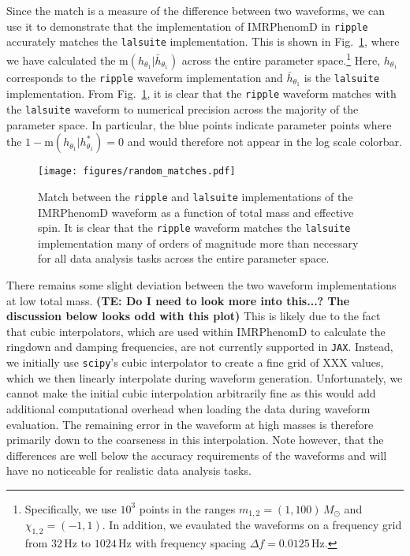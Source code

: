 \documentclass[twocolumn]{aastex631}
\newcommand{\jax}{\texttt{JAX}\xspace}
\newcommand{\ripple}{\texttt{ripple}\xspace}
\newcommand{\lalsuite}{\texttt{lalsuite}\xspace}
\newcommand{\te}[1]{\textbf{\color{pyGreen}(TE: #1)}}
\begin{document}
Since the match is a measure of the difference between two waveforms, we can use it to demonstrate that the implementation of IMRPhenomD in \ripple accurately matches the \lalsuite implementation.
This is shown in Fig.~\ref{fig:match}, where we have calculated the $\mathrm{m}(h_{\theta_1}|\bar{h}_{\theta_1})$ across the entire parameter space.\footnote{
    Specifically, we use $10^3$ points in the ranges $m_{1,2} = (1,100)\,M_{\odot}$ and $\chi_{1,2} = (-1,1)$. In addition, we evaulated the waveforms on a frequency grid from $32\,$Hz to $1024\,$Hz with frequency spacing $\Delta f = 0.0125 \,$Hz.
}
Here, $h_{\theta_1}$ corresponds to the \ripple waveform implementation and $\bar{h}_{\theta_1}$ is the \lalsuite implementation. 
From Fig.~\ref{fig:match}, it is clear that the \ripple waveform matches with the \lalsuite waveform to numerical precision across the majority of the parameter space.
In particular, the blue points indicate parameter points where the $1-\mathrm{m}(h_{\theta_1}|h^{*}_{\theta_1})=0$ and would therefore not appear in the log scale colorbar.
\begin{figure}[t]
    \begin{centering}
        \texttt{[image: figures/random\_matches.pdf]}
        \caption{
            Match between the \ripple and \lalsuite implementations of the IMRPhenomD waveform as a function of total mass and effective spin. 
            It is clear that the \ripple waveform matches the \lalsuite implementation many of orders of magnitude more than necessary for all data analysis tasks across the entire parameter space.
        }
        \label{fig:match}
    \end{centering}
\end{figure}

There remains some slight deviation between the two waveform implementations at low total mass. \te{Do I need to look more into this...? The discussion below looks odd with this plot}
This is likely due to the fact that cubic interpolators, which are used within IMRPhenomD to calculate the ringdown and damping frequencies, are not currently supported in \jax.
Instead, we initially use \texttt{scipy}'s cubic interpolator to create a fine grid of XXX values, which we then linearly interpolate during waveform generation.
Unfortunately, we cannot make the initial cubic interpolation arbitrarily fine as this would add additional computational overhead when loading the data during waveform evaluation.
The remaining error in the waveform at high masses is therefore primarily down to the coarseness in this interpolation.
Note however, that the differences are well below the accuracy requirements of the waveforms and will have no noticeable for realistic data analysis tasks.
\end{document}
